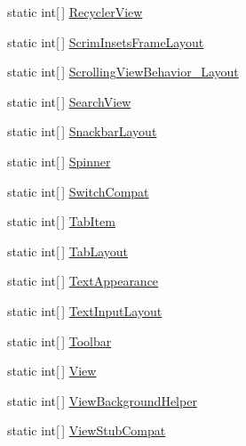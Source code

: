 \begin{CompactItemize}
\item 
static int\mbox{[}$\,$\mbox{]} \hyperlink{class__2doo_1_1_droid_1_1_resource_1_1_styleable_7d5ca3ee42fa80322fad607f7e33e8e5}{RecyclerView}
\item 
static int\mbox{[}$\,$\mbox{]} \hyperlink{class__2doo_1_1_droid_1_1_resource_1_1_styleable_0980ebfb42823b6688349049589d49e4}{ScrimInsetsFrameLayout}
\item 
static int\mbox{[}$\,$\mbox{]} \hyperlink{class__2doo_1_1_droid_1_1_resource_1_1_styleable_d519326854431b27fa980b96c355d002}{ScrollingViewBehavior\_\-Layout}
\item 
static int\mbox{[}$\,$\mbox{]} \hyperlink{class__2doo_1_1_droid_1_1_resource_1_1_styleable_2f656b1eaea7ce48ed29f58fa9e8f12e}{SearchView}
\item 
static int\mbox{[}$\,$\mbox{]} \hyperlink{class__2doo_1_1_droid_1_1_resource_1_1_styleable_6bc6490d33c608c748714bff87be3313}{SnackbarLayout}
\item 
static int\mbox{[}$\,$\mbox{]} \hyperlink{class__2doo_1_1_droid_1_1_resource_1_1_styleable_b3e73c21bdfe8448ef02e8f06eff7cd0}{Spinner}
\item 
static int\mbox{[}$\,$\mbox{]} \hyperlink{class__2doo_1_1_droid_1_1_resource_1_1_styleable_74d2c71c6d6e05a51734526218413e93}{SwitchCompat}
\item 
static int\mbox{[}$\,$\mbox{]} \hyperlink{class__2doo_1_1_droid_1_1_resource_1_1_styleable_fb90691204efbe55079c5d16006356cf}{TabItem}
\item 
static int\mbox{[}$\,$\mbox{]} \hyperlink{class__2doo_1_1_droid_1_1_resource_1_1_styleable_041b4c3cbc7f47c97f77a397055effec}{TabLayout}
\item 
static int\mbox{[}$\,$\mbox{]} \hyperlink{class__2doo_1_1_droid_1_1_resource_1_1_styleable_e6781b389d581d21847d7c409602c8d8}{TextAppearance}
\item 
static int\mbox{[}$\,$\mbox{]} \hyperlink{class__2doo_1_1_droid_1_1_resource_1_1_styleable_fd09dc80206f1b00ce4229d673046239}{TextInputLayout}
\item 
static int\mbox{[}$\,$\mbox{]} \hyperlink{class__2doo_1_1_droid_1_1_resource_1_1_styleable_4e02897f43c7f7de80a07f6ff2251a81}{Toolbar}
\item 
static int\mbox{[}$\,$\mbox{]} \hyperlink{class__2doo_1_1_droid_1_1_resource_1_1_styleable_60ee2cb64d3fb1dd64634bb3d3c24211}{View}
\item 
static int\mbox{[}$\,$\mbox{]} \hyperlink{class__2doo_1_1_droid_1_1_resource_1_1_styleable_9a35bbba744f84ca8ce9e0f3f8935b6c}{ViewBackgroundHelper}
\item 
static int\mbox{[}$\,$\mbox{]} \hyperlink{class__2doo_1_1_droid_1_1_resource_1_1_styleable_10c5bdeb8496455d9d7673eae67efe7a}{ViewStubCompat}
\end{CompactItemize}
